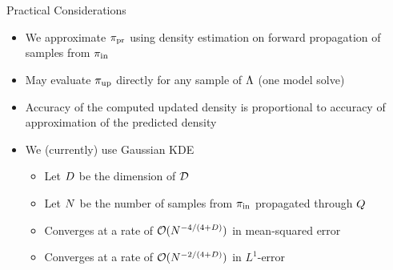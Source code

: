 %
%
%
%
%
%
%


\begin{frame}[t]{Practical Considerations}

\begin{itemize}
	\item We approximate $\operatorname*{\pi_{pr}}$ using density estimation on forward propagation of samples from $\operatorname*{\pi_{in}}$
	\item May evaluate $\operatorname*{\pi_{up}}$ directly for any sample of ${\Lambda}$ (one model solve)
	\item Accuracy of the computed updated density is proportional to accuracy of approximation of the predicted density
	\item We (currently) use Gaussian KDE
	\begin{itemize}
			\item Let $D$ be the dimension of $\mathcal{D}$
			\item Let $N$ be the number of samples from $\operatorname*{\pi_{in}}$ propagated through $Q$
			\item Converges at a rate of $\mathcal{O}(N^{-4/(4+D)})$ in mean-squared error
			\item Converges at a rate of $\mathcal{O}(N^{-2/(4+D)})$ in $L^1$-error
	\end{itemize}
\end{itemize}
\end{frame}
